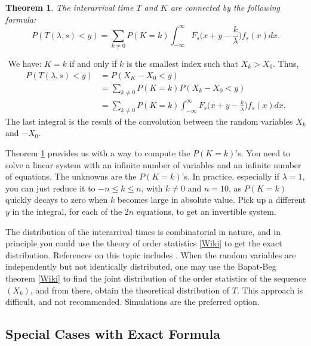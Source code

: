 \documentclass[10pt]{article}
\newtheorem{theorem}{Theorem}[section]
\newenvironment{proof}[1][Proof]{\begin{trivlist}
\item[\hskip \labelsep {\bfseries #1}]}{\end{trivlist}}
\newcommand{\qed}{\nobreak \ifvmode \relax \else
      \ifdim\lastskip<1.5em \hskip-\lastskip
      \hskip1.5em plus0em minus0.5em \fi \nobreak
      \vrule height0.75em width0.5em depth0.25em\fi}
\begin{document}
\begin{theorem}
\label{sums5}
The interarrival time $T$ and $K$ are connected by the following formula:
$$P(T(\lambda,s)<y)=\sum_{k\neq 0} P(K=k)\int_{-\infty}^\infty F_s\Big(x+y-\frac{k}{\lambda}\Big)f_s(x)dx.$$
 \end{theorem}
\begin{proof}
$ $ \newline
We have: $K=k$ if and only if $k$ is the smallest index such that $X_k>X_0$. Thus,
\begin{align}
P(T(\lambda,s)<y) & = P(X_K-X_0<y)\nonumber\\
  &=\sum_{k\neq 0} P(K=k)P(X_k-X_0<y) \nonumber \\
  &= \sum_{k\neq 0} P(K=k)\int_{-\infty}^\infty F_s\Big(x+y-\frac{k}{\lambda}\Big)f_s(x)dx. \nonumber
\end{align}
The last integral is the result of the convolution between the random variables $X_k$ and $-X_0$.
\qed
\end{proof}

Theorem \ref{sums5} provides us with a way to compute the $P(K=k)$'s. You need to solve a linear system with an infinite number of variables and an infinite number of equations. The unknowns are the $P(K=k)$'s. In practice, especially if $\lambda=1$, you can just reduce it to $-n\leq k \leq n$, with $k\neq 0$ and $n=10$, as $P(K=k)$ quickly decays to zero when $k$ becomes large in absolute value. Pick up a different $y$ in the integral, for each of the $2n$ equations, to get an invertible system.

The distribution of the interarrival times is combinatorial in nature, and in principle you could use the theory of \textcolor{index}{order statistics} [\href{https://en.wikipedia.org/wiki/Order_statistic}{Wiki}]
to get the exact distribution. References on this topic includes \cite{order2,order3}. When the random variables are independently but not identically distributed,
one may use the Bapat-Beg theorem [\href{https://bit.ly/3oOqd7j}{Wiki}] to find the joint distribution of the order statistics of the sequence $(X_k)$, and from there, obtain the theoretical distribution of $T$. This approach is difficult, and not recommended. Simulations are the preferred option.

\subsection{Special Cases with Exact Formula}
\end{document}
